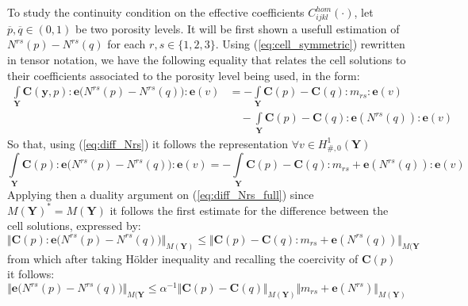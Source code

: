 To study the continuity condition on the effective coefficients $C^{hom}_{ijkl}(\cdot)$, let $\overline{p},\overline{q} \in (0,1)$ be two porosity levels. It will be first shown a usefull estimation of $N^{rs}(p)-N^{rs}(q)$ for each $r,s \in \{1,2,3\}$. 
Using (\ref{eq:cell_symmetric}) rewritten in tensor notation, we have the following equality that relates the cell solutions to their coefficients associated to the porosity level being used, in the form:
\begin{equation}
    \label{eq:diff_Nrs}
    \begin{array}{cc}
        \int\limits_{\mathbf{Y}} \mathbf{C}(\mathbf{y},p):\mathbf{e}\big( N^{rs}(p)-N^{rs}(q) \big) : \mathbf{e}(v) & =  -\int\limits_{\mathbf{Y}} \mathbf{C}(p)-\mathbf{C}(q) : m_{rs}:\mathbf{e}(v) \\
        & \quad - \int\limits_{\mathbf{Y}}\mathbf{C}(p)-\mathbf{C}(q):\mathbf{e}(N^{rs}(q)):\mathbf{e}(v)
    \end{array}
\end{equation}
So that, using (\ref{eq:diff_Nrs}) it follows the representation $\forall v \in H^1_{\#,0}(\mathbf{Y})$
\begin{equation}
    \label{eq:diff_Nrs_full}
    \int\limits_{\mathbf{Y}} \mathbf{C}(p):\mathbf{e}\big(N^{rs}(p)-N^{rs}(q)\big):\mathbf{e}(v) = -\int\limits_{\mathbf{Y}} \mathbf{C}(p)-\mathbf{C}(q):m_{rs}+\mathbf{e}(N^{rs}(q)):\mathbf{e}(v)
\end{equation}
Applying then a duality argument on (\ref{eq:diff_Nrs_full}) since $M(\mathbf{Y})^* = M(\mathbf{Y})$ it follows the first estimate for the difference between the cell solutions, expressed by:
\begin{equation*}
    \Vert \mathbf{C}(p):\mathbf{e}\big(N^{rs}(p)-N^{rs}(q)\big) \Vert_{M(\mathbf{Y})} \leq \Vert \mathbf{C}(p)-\mathbf{C}(q):m_{rs}+\mathbf{e}(N^{rs}(q))\Vert_{M(\mathbf{Y}}
\end{equation*}
from which after taking H\"{o}lder inequality and recalling the coercivity of $\mathbf{C}(p)$ it follows:
\begin{equation}
    \label{eq:ineq_diff_N}
    \Vert \mathbf{e}\big(N^{rs}(p)-N^{rs}(q)\big) \Vert_{M(\mathbf{Y}} \leq \alpha^{-1}\Vert \mathbf{C}(p)-\mathbf{C}(q) \Vert_{M(\mathbf{Y})} \Vert m_{rs}+\mathbf{e}(N^{rs}) \Vert_{M(\mathbf{Y})}
\end{equation}

